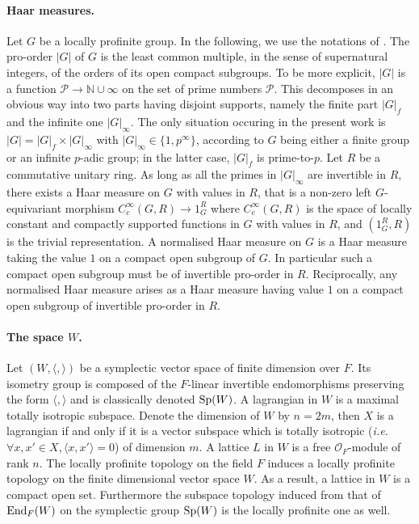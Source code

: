 \documentclass[11pt]{article}
\theoremstyle{plain}
\theoremstyle{definition}
\theoremstyle{plain}
\theoremstyle{definition}
\theoremstyle{plain}
\begin{document}
\paragraph{Haar measures.} Let $G$ be a locally profinite group. In the following, we use the notations of \cite[I.1 \& I.2]{vig_book}. The pro-order $|G|$ of $G$ is the least common multiple, in the sense of supernatural integers, of the orders of its open compact subgroups. To be more explicit, $|G|$ is a function $\mathcal{P} \to \mathbb{N} \cup {\infty}$ on the set of prime numbers $\mathcal{P}$. This decomposes in an obvious way into two parts having disjoint supports, namely the finite part $|G|_f$ and the infinite one $|G|_\infty$. The only situation occuring in the present work is $|G| = |G|_f \times |G|_\infty$ with $|G|_\infty \in \{ 1, p^\infty \}$, according to $G$ being either a finite group or an infinite $p$-adic group; in the latter case, $|G|_f$ is prime-to-$p$. Let $R$ be a commutative unitary ring. As long as all the primes in $|G|_\infty$ are invertible in $R$, there exists a Haar measure on $G$ with values in $R$, that is a non-zero left $G$-equivariant morphism $C_c^\infty(G,R) \to 1_G^R$ where $C_c^\infty(G,R)$ is the space of locally constant and compactly supported functions in $G$ with values in $R$, and $(1_G^R,R)$ is the trivial representation. A normalised Haar measure on $G$ is a Haar measure taking the value $1$ on a compact open subgroup of $G$. In particular such a compact open subgroup must be of invertible pro-order in $R$. Reciprocally, any normalised Haar measure arises as a Haar measure having value $1$ on a compact open subgroup of invertible pro-order in $R$.


\paragraph{The space $W$.} Let $(W,\langle,\rangle)$ be a symplectic vector space of finite dimension over $F$. Its isometry group is composed of the $F$-linear invertible endomorphisms preserving the form $\langle,\rangle$ and is classically denoted $\textup{Sp}(W)$. A lagrangian in $W$ is a maximal totally isotropic subspace. Denote the dimension of $W$ by $n=2m$, then $X$ is a lagrangian if and only if it is a vector subspace which is totally isotropic (\textit{i.e.} $\forall x, x' \in X, \langle x,x' \rangle=0$) of dimension $m$. A lattice $L$ in $W$ is a free $\mathcal{O}_F$-module of rank $n$. The locally profinite topology on the field $F$ induces a locally profinite topology on the finite dimensional vector space $W$. As a result, a lattice in $W$ is a compact open set. Furthermore the subspace topology induced from that of $\textup{End}_F(W)$ on the symplectic group $\textup{Sp}(W)$ is the locally profinite one as well.
\end{document}
